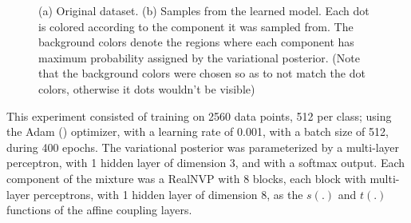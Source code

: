 \begin{figure}[!htb]
  \begin{subfigmatrix}{2}
  \end{subfigmatrix}
    \caption{(a) Original dataset. (b) Samples from the learned model. Each
dot is colored according to the component it was sampled from. The background
colors denote the regions where each component has maximum probability assigned
by the variational posterior. (Note that the background colors were chosen
so as to not match the dot colors, otherwise it dots wouldn't be visible)}
  \label{fig:pinwheel}
\end{figure}

This experiment consisted of training on 2560 data points, 512 per class; using
the Adam (\autocite{adam}) optimizer, with a learning rate of 0.001, with a
batch size of 512, during 400 epochs. The variational posterior was parameterized
by a multi-layer perceptron, with 1 hidden layer of dimension 3, and with a
softmax output. Each component of the mixture was a RealNVP with 8 blocks, each
block with multi-layer perceptrons, with 1 hidden layer of dimension 8, as the
$s(.)$ and $t(.)$ functions of the affine coupling layers.

